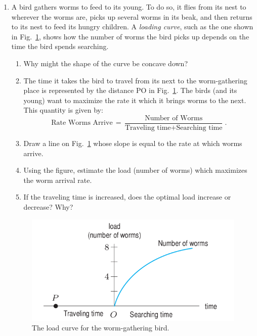 \documentclass[12pt]{article}
\begin{document}
\begin{enumerate}
\item A bird gathers worms to feed to its young.  To do so, it flies
  from its nest to wherever the worms are, picks up several worms in
  its beak, and then returns to its nest to feed its hungry
  children. A \emph{loading curve}, such as the one shown in
  Fig.~\ref{fig:worms}, shows how the number of worms the bird picks
  up depends on the time the bird spends searching.
  \begin{enumerate}
    \setlength{\itemsep}{1mm}
  \item Why might the shape of the curve be concave down?  
  \item The time it takes the bird to travel from its next to the
    worm-gathering place is represented by the distance PO in
    Fig.~\ref{fig:worms}.  The birds (and its young) want to maximize
    the rate it which it brings worms to the next. This quantity is
    given by:
    \begin{equation}
      \text{Rate Worms Arrive} \, = \, \frac{\text{Number of
          Worms}}{\text{Traveling time} + \text{Searching time}} \;.
    \end{equation}
    \item Draw a line on Fig.~\ref{fig:worms} whose slope is equal to
      the rate at which worms arrive.
    \item Using the figure, estimate the load (number of worms) which
      maximizes the worm arrival rate.
    \item If the traveling time is increased, does the optimal load
      increase or decrease?  Why?
  \end{enumerate}


\begin{figure}[h!]
\begin{center}
\vspace{-1mm}
\includegraphics[width=5.60in]{worms.png}
\vspace{-2mm}
\caption{The load curve for the worm-gathering bird.}
\label{fig:worms}
\vspace{-5mm}
\end{center}
\end{figure}


\end{enumerate}
\end{document}
